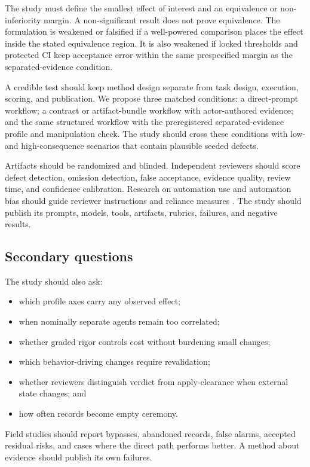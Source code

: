 \documentclass[11pt]{article}
\begin{document}
The study must define the smallest effect of interest and an equivalence or non-inferiority margin. A non-significant result does not prove equivalence. The formulation is weakened or falsified if a well-powered comparison places the effect inside the stated equivalence region. It is also weakened if locked thresholds and protected CI keep acceptance error within the same prespecified margin as the separated-evidence condition.

A credible test should keep method design separate from task design, execution, scoring, and publication. We propose three matched conditions: a direct-prompt workflow; a contract or artifact-bundle workflow with actor-authored evidence; and the same structured workflow with the preregistered separated-evidence profile and manipulation check. The study should cross these conditions with low- and high-consequence scenarios that contain plausible seeded defects.

Artifacts should be randomized and blinded. Independent reviewers should score defect detection, omission detection, false acceptance, evidence quality, review time, and confidence calibration. Research on automation use and automation bias should guide reviewer instructions and reliance measures \citep{parasuraman1997automation,skitka1999automation}. The study should publish its prompts, models, tools, artifacts, rubrics, failures, and negative results.

\subsection{Secondary questions}

The study should also ask:

\begin{itemize}
  \item which profile axes carry any observed effect;
  \item when nominally separate agents remain too correlated;
  \item whether graded rigor controls cost without burdening small changes;
  \item which behavior-driving changes require revalidation;
  \item whether reviewers distinguish verdict from apply-clearance when external state changes; and
  \item how often records become empty ceremony.
\end{itemize}

Field studies should report bypasses, abandoned records, false alarms, accepted residual risks, and cases where the direct path performs better. A method about evidence should publish its own failures.
\end{document}
